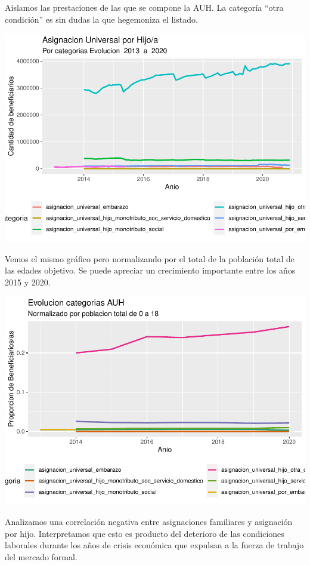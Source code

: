 \documentclass[
  12,
]{article}
\begin{document}
Aislamos las prestaciones de las que se compone la AUH. La categoría
``otra condición'' es sin dudas la que hegemoniza el listado.

\includegraphics{Grupo4_Final_files/figure-latex/datos_prestaciones_auh-1.pdf}

Vemos el mismo gráfico pero normalizando por el total de la población
total de las edades objetivo. Se puede apreciar un crecimiento
importante entre los años 2015 y 2020.

\includegraphics{Grupo4_Final_files/figure-latex/grafico_prestaciones_proporcion-1.pdf}

Analizamos una correlación negativa entre asignaciones familiares y
asignación por hijo. Interpretamos que esto es producto del deterioro de
las condiciones laborales durante los años de crisis económica que
expulsan a la fuerza de trabajo del mercado formal.
\end{document}
